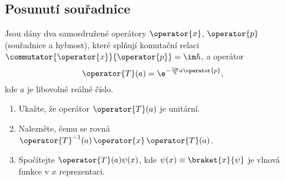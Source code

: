 \subsection{Posunutí souřadnice}\label{sec:TranslationOperator}
Jsou dány dva samosdružené operátory $\operator{x}$, $\operator{p}$ (souřadnice a hybnost), 
které splňují komutační relaci $\commutator{\operator{x}}{\operator{p}}=\im\hbar$,
a operátor
\begin{equation}\label{eq:TranslationOperator}
    \operator{T}(a)
        =\e^{-\frac{\im}{\hbar}a\operator{p}},
\end{equation}
kde $a$ je libovolné reálné číslo. 
\begin{enumerate}
\item
    Ukažte, že operátor $\operator{T}(a)$ je unitární.
\item
    Nalezněte, čemu se rovná $\operator{T}^{-1}(a)\,\operator{x}\,\operator{T}(a)$.
\item
    Spočítejte $\operator{T}(a)\psi(x)$, kde $\psi(x)\equiv\braket{x}{\psi}$ je vlnová funkce v $x$ reprezentaci.
\end{enumerate}

